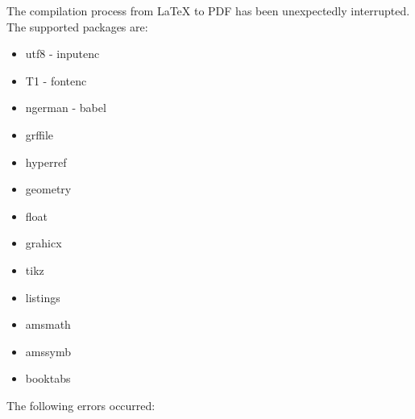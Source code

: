 The compilation process from \LaTeX{} to PDF has been unexpectedly interrupted.
The supported packages are:

\begin{itemize}
    \item utf8 - inputenc
    \item T1 - fontenc
    \item ngerman - babel
    \item grffile
    \item hyperref
    \item geometry
    \item float
    \item grahicx
    \item tikz
    \item listings
    \item amsmath
    \item amssymb
    \item booktabs
\end{itemize}

The following errors occurred:

